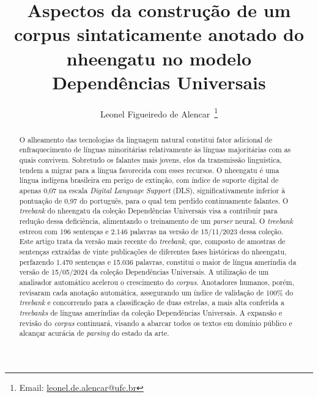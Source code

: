 \documentclass[portuguese]{textolivre}
\title{Aspectos da construção de um corpus sintaticamente anotado do nheengatu no modelo Dependências Universais}
\author[1]{Leonel Figueiredo de Alencar~\orcid{0000-0001-8148-6994}\thanks{Email: \href{mailto:leonel.de.alencar@ufc.br}{leonel.de.alencar@ufc.br}}}
\affil[1]{Universidade Federal do Ceará, Centro de Humanidades, Fortaleza, CE, Brasil.}
\begin{document}
\maketitle

\begin{polyabstract}
\begin{abstract}
O alheamento das tecnologias da linguagem natural constitui fator adicional de enfraquecimento de línguas minoritárias relativamente às línguas majoritárias com as quais convivem. Sobretudo os falantes mais jovens, elos da transmissão linguística, tendem a migrar para a língua favorecida com esses recursos. O nheengatu é uma língua indígena brasileira em perigo de extinção, com índice de suporte digital de apenas 0,07 na escala \textit{Digital Language Support} (DLS), significativamente inferior à pontuação de 0,97 do português, para o qual tem perdido continuamente falantes. O \textit{treebank} do nheengatu da coleção Dependências Universais visa a contribuir para redução dessa deficiência, alimentando o treinamento de um \textit{parser} neural. O \textit{treebank} estreou com 196 sentenças e 2.146 palavras na versão de 15/11/2023 dessa coleção. Este artigo trata da versão mais recente do \textit{treebank}, que, composto de amostras de sentenças extraídas de vinte publicações de diferentes fases históricas do nheengatu, perfazendo 1.470 sentenças e 15.036 palavras, constitui o maior de língua ameríndia da versão de 15/05/2024 da coleção Dependências Universais. A utilização de um analisador automático acelerou o crescimento do \textit{corpus}. Anotadores humanos, porém, revisaram cada anotação automática, assegurando um índice de validação de 100\% do \textit{treebank} e concorrendo para a classificação de duas estrelas, a mais alta conferida a \textit{treebanks} de línguas ameríndias da coleção Dependências Universais. A expansão e revisão do \textit{corpus} continuará, visando a abarcar todos os textos em domínio público e alcançar acurácia de \textit{parsing} do estado da arte.


\end{abstract}


\end{polyabstract}
\end{document}
